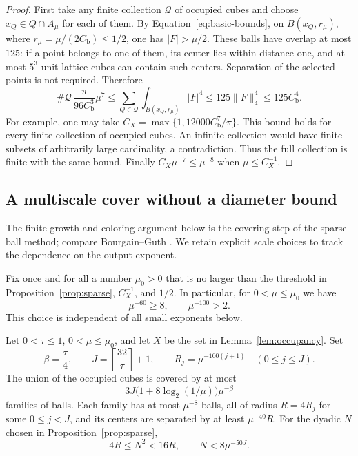 \begin{proof}
First take any finite collection $\mathcal Q$ of occupied cubes
and choose $x_Q\in Q\cap A_\mu$ for each of them.  By
Equation~\eqref{eq:basic-bounds}, on
$B(x_Q,r_\mu)$, where $r_\mu=\mu/(2C_{\mathrm b})\leq1/2$,
one has $|F|>\mu/2$.  These balls have overlap at most $125$:
if a point belongs to one of them, its center lies within distance
one, and at most $5^3$ unit lattice cubes can contain such centers.
Separation of the selected points is not required.  Therefore
\[
 \#\mathcal Q\,\frac{\pi}{96C_{\mathrm b}^3}\mu^7
 \leq\sum_{Q\in\mathcal Q}\int_{B(x_Q,r_\mu)}|F|^4
 \leq125\|F\|_4^4\leq125C_{\mathrm b}^4.
\]
For example, one may take
$C_X=\max\{1,12000C_{\mathrm b}^7/\pi\}$.
This bound holds for every finite collection of occupied cubes.
An infinite collection would have finite subsets of arbitrarily
large cardinality, a contradiction.  Thus the full collection is
finite with the same bound.  Finally
$C_X\mu^{-7}\leq\mu^{-8}$ when $\mu\leq C_X^{-1}$.
\end{proof}

\subsection{A multiscale cover without a diameter bound}

The finite-growth and coloring argument below is the covering step
of the sparse-ball method; compare Bourgain--Guth
\cite[arXiv version~3, Appendix, Lemma~A.2]{BourgainGuth2011}.
We retain explicit scale choices to track the dependence on the output
exponent.

Fix once and for all a number $\mu_0>0$ that is no larger than
the threshold in Proposition~\ref{prop:sparse}, $C_X^{-1}$, and
$1/2$.  In particular, for $0<\mu\leq\mu_0$ we have
\begin{equation}\label{eq:fixed-geometric-thresholds}
 \mu^{-60}\geq8,\qquad \mu^{-100}>2.
\end{equation}
This choice is independent of all small exponents below.

\begin{lemma}\label{lem:sparse-cover}
Let $0<\tau\leq1$, $0<\mu\leq\mu_0$, and let $X$ be the set
in Lemma~\ref{lem:occupancy}.  Set
\begin{equation}\label{eq:cover-scales}
 \beta=\frac{\tau}{4},\qquad
 J=\left\lceil\frac{32}{\tau}\right\rceil+1,\qquad
 R_j=\mu^{-100(j+1)}\quad(0\leq j\leq J).
\end{equation}
The union of the occupied cubes is covered by at most
\begin{equation}\label{eq:family-count}
 3J\bigl(1+8\log_2(1/\mu)\bigr)\mu^{-\beta}
\end{equation}
families of balls.  Each family has at most $\mu^{-8}$ balls,
all of radius $R=4R_j$ for some $0\leq j<J$, and its centers
are separated by at least $\mu^{-40}R$.
For the dyadic $N$ chosen in Proposition~\ref{prop:sparse},
\begin{equation}\label{eq:cover-N}
 4R\leq N^2<16R,\qquad N<8\mu^{-50J}.
\end{equation}
\end{lemma}

